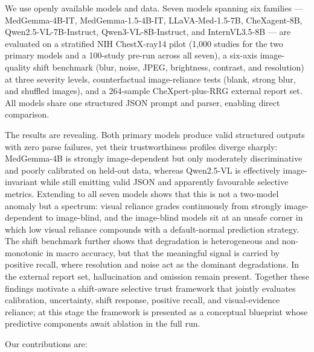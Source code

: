 We use openly available models and data. Seven models spanning six families --- MedGemma-4B-IT, MedGemma-1.5-4B-IT, LLaVA-Med-1.5-7B, CheXagent-8B, Qwen2.5-VL-7B-Instruct, Qwen3-VL-8B-Instruct, and InternVL3.5-8B --- are evaluated on a stratified NIH ChestX-ray14 pilot (1,000 studies for the two primary models and a 100-study pre-run across all seven), a six-axis image-quality shift benchmark (blur, noise, JPEG, brightness, contrast, and resolution) at three severity levels, counterfactual image-reliance tests (blank, strong blur, and shuffled images), and a 264-sample CheXpert-plus-RRG external report set. All models share one structured JSON prompt and parser, enabling direct comparison.

The results are revealing. Both primary models produce valid structured outputs with zero parse failures, yet their trustworthiness profiles diverge sharply: MedGemma-4B is strongly image-dependent but only moderately discriminative and poorly calibrated on held-out data, whereas Qwen2.5-VL is effectively image-invariant while still emitting valid JSON and apparently favourable selective metrics. Extending to all seven models shows that this is not a two-model anomaly but a spectrum: visual reliance grades continuously from strongly image-dependent to image-blind, and the image-blind models sit at an unsafe corner in which low visual reliance compounds with a default-normal prediction strategy. The shift benchmark further shows that degradation is heterogeneous and non-monotonic in macro accuracy, but that the meaningful signal is carried by positive recall, where resolution and noise act as the dominant degradations. In the external report set, hallucination and omission remain present. Together these findings motivate a shift-aware selective trust framework that jointly evaluates calibration, uncertainty, shift response, positive recall, and visual-evidence reliance; at this stage the framework is presented as a conceptual blueprint whose predictive components await ablation in the full run.

Our contributions are:

